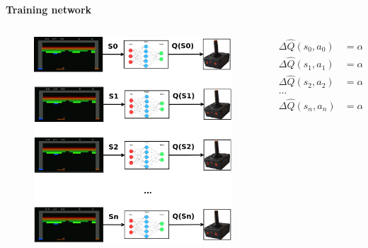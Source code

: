 \documentclass[xcolor=dvipsnames]{beamer}
\begin{document}
\begin{frame}{\bf Training network}

\begin{columns}
  \begin{column}{0.5\textwidth}

      \begin{figure}
        \includegraphics[scale=0.12]{../../diagrams/q_net_unrolled.png}
      \end{figure}

  \end{column}
  \begin{column}{0.5\textwidth}  %

      \begin{align*}
        \Delta \hat{Q} (s_0, a_0) &= \alpha\Big(R(s_0, a_0) + \gamma \hat{Q}(s_1, a_1)\Big) \\
        \Delta \hat{Q}(s_1, a_1) &= \alpha\Big(R(s_1, a_1) + \gamma \hat{Q}(s_2, a_2)\Big) \\
        \Delta \hat{Q}(s_2, a_2) &= \alpha\Big(R(s_2, a_2) + \gamma \hat{Q}(s_3, a_3)\Big) \\
        ... \\
        \Delta \hat{Q}(s_{n}, a_{n}) &= \alpha\Big(R(s_{n}, a_{n}) + \gamma \hat{Q}(s_{n+1}, a_{n+1})\Big)
      \end{align*}

  \end{column}
\end{columns}


\end{frame}
\end{document}

